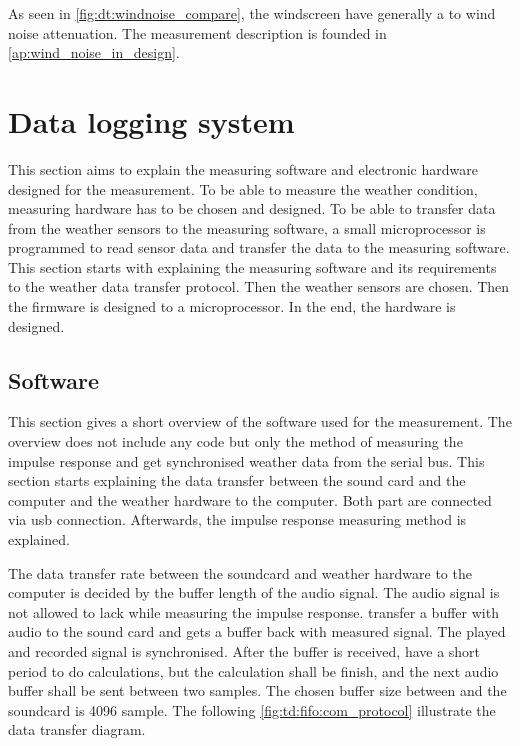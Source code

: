 
As seen in \autoref{fig:dt:windnoise_compare}, the windscreen have generally a  to  wind noise attenuation. The measurement description is founded in \autoref{ap:wind_noise_in_design}. 



\section{Data logging system}\label{sec:data_log_sys}
This section aims to explain the measuring software and electronic hardware designed for the measurement. To be able to measure the weather condition, measuring hardware has to be chosen and designed. To be able to transfer data from the weather sensors to the measuring software, a small microprocessor is programmed to read sensor data and transfer the data to the measuring software. This section starts with explaining the measuring software and its requirements to the weather data transfer protocol. Then the weather sensors are chosen. Then the firmware is designed to a microprocessor. In the end, the hardware is designed.

\subsection{Software}
This section gives a short overview of the \matlab software used for the measurement. The overview does not include any code but only the method of measuring the impulse response and get synchronised weather data from the serial bus. This section starts explaining the data transfer between the sound card and the computer and the weather hardware to the computer. Both part are connected via \gls{usb} connection. Afterwards, the impulse response measuring method is explained.

The data transfer rate between the soundcard and weather hardware to the computer is decided by the buffer length of the audio signal. The audio signal is not allowed to lack while measuring the impulse response. \matlab transfer a buffer with audio to the sound card and gets a buffer back with measured signal. The played and recorded signal is synchronised. After the buffer is received, \matlab have a short period to do calculations, but the calculation shall be finish, and the next audio buffer shall be sent between two samples.  The chosen buffer size between \matlab and the soundcard is 4096 sample. The following \autoref{fig:td:fifo:com_protocol} illustrate the data transfer diagram.

